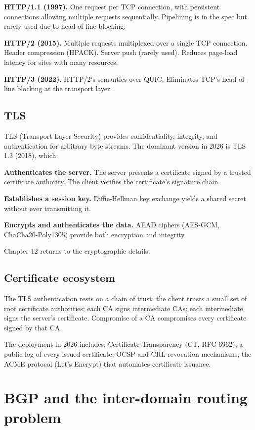 \textbf{HTTP/1.1 (1997).} One request per TCP connection, with persistent connections allowing multiple requests sequentially. Pipelining is in the spec but rarely used due to head-of-line blocking.

\textbf{HTTP/2 (2015).} Multiple requests multiplexed over a single TCP connection. Header compression (HPACK). Server push (rarely used). Reduces page-load latency for sites with many resources.

\textbf{HTTP/3 (2022).} HTTP/2's semantics over QUIC. Eliminates TCP's head-of-line blocking at the transport layer.

\subsection{TLS}

TLS (Transport Layer Security) provides confidentiality, integrity, and authentication for arbitrary byte streams. The dominant version in 2026 is TLS 1.3 (2018), which:

\textbf{Authenticates the server.} The server presents a certificate signed by a trusted certificate authority. The client verifies the certificate's signature chain.

\textbf{Establishes a session key.} Diffie-Hellman key exchange yields a shared secret without ever transmitting it.

\textbf{Encrypts and authenticates the data.} AEAD ciphers (AES-GCM, ChaCha20-Poly1305) provide both encryption and integrity.

Chapter 12 returns to the cryptographic details.

\subsection{Certificate ecosystem}

The TLS authentication rests on a chain of trust: the client trusts a small set of root certificate authorities; each CA signs intermediate CAs; each intermediate signs the server's certificate. Compromise of a CA compromises every certificate signed by that CA.

The deployment in 2026 includes: Certificate Transparency (CT, RFC 6962), a public log of every issued certificate; OCSP and CRL revocation mechanisms; the ACME protocol (Let's Encrypt) that automates certificate issuance.

\section{BGP and the inter-domain routing problem}

